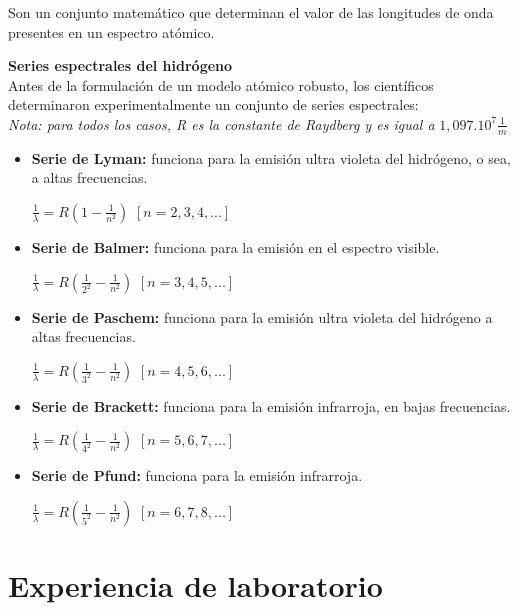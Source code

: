 \documentclass[a4paper]{article}
\begin{document}
        \indent Son un conjunto matemático que determinan el valor de las longitudes de onda presentes en un espectro atómico.

        \textbf{Series espectrales del hidrógeno} \\
            Antes de la formulación de un modelo atómico robusto, los científicos determinaron experimentalmente un conjunto de series espectrales: \\

            \textit{Nota: para todos los casos, R es la constante de Raydberg y es igual a} $1,097 . 10^7 \frac{1}{m}$ \\

            \saltoPag

            \begin{itemize}
                \item \textbf{Serie de Lyman:} funciona para la emisión ultra violeta del hidrógeno, o sea, a altas frecuencias. 
                    \begin{center}
                        $\frac {1}{\lambda} = R(1 - {\frac{1}{n^2}})$ \hspace{2mm} $[n = 2,3,4,...]$
                    \end{center}

                \item \textbf{Serie de Balmer:} funciona para la emisión en el espectro visible.
                    \begin{center}
                        $\frac {1}{\lambda} = R({\frac{1}{2^2}} - {\frac{1}{n^2}})$ \hspace{2mm} $[n = 3,4,5,...]$
                    \end{center}

                \item \textbf{Serie de Paschem:} funciona para la emisión ultra violeta del hidrógeno a altas frecuencias.
                    \begin{center}
                        $\frac {1}{\lambda} = R({\frac{1}{3^2}} - {\frac{1}{n^2}})$ \hspace{2mm} $[n = 4,5,6,...]$
                    \end{center}

                \item \textbf{Serie de Brackett:} funciona para la emisión infrarroja, en bajas frecuencias.
                    \begin{center}
                        $\frac {1}{\lambda} = R({\frac{1}{4^2}} - {\frac{1}{n^2}})$ \hspace{2mm} $[n = 5,6,7,...]$
                    \end{center}

                \item \textbf{Serie de Pfund:} funciona para la emisión infrarroja.
                    \begin{center}
                        $\frac {1}{\lambda} = R({\frac{1}{5^2}} - {\frac{1}{n^2}})$ \hspace{2mm} $[n = 6,7,8,...]$
                    \end{center}
            \end{itemize}
        
\section{Experiencia de laboratorio}
\end{document}

